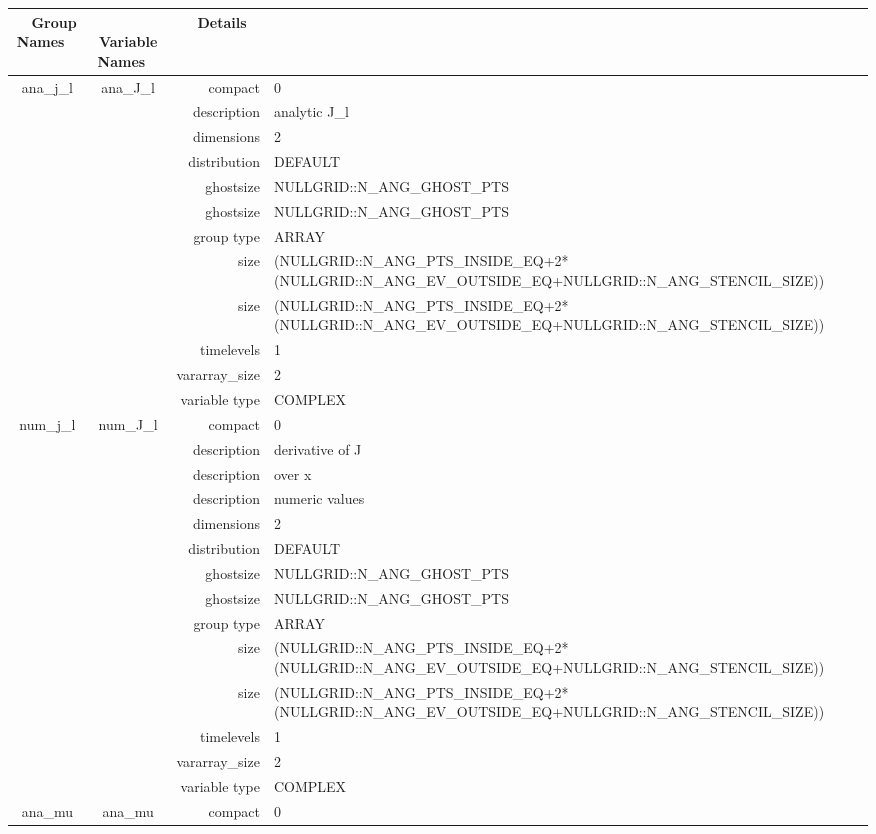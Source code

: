 \begin{tabular*}{150mm}{|c|c@{\extracolsep{\fill}}|rl|} \hline 
~ {\bf Group Names} ~ & ~ {\bf Variable Names} ~  &{\bf Details} ~ & ~ \\ 
\hline 
ana\_j\_l & ana\_J\_l & compact & 0 \\ 
 &  & description & analytic J\_l \\ 
 &  & dimensions & 2 \\ 
 &  & distribution & DEFAULT \\ 
 &  & ghostsize & NULLGRID::N\_ANG\_GHOST\_PTS \\ 
& ~ & ghostsize & NULLGRID::N\_ANG\_GHOST\_PTS \\ 
 &  & group type & ARRAY \\ 
 &  & size & (NULLGRID::N\_ANG\_PTS\_INSIDE\_EQ+2*(NULLGRID::N\_ANG\_EV\_OUTSIDE\_EQ+NULLGRID::N\_ANG\_STENCIL\_SIZE)) \\ 
& ~ & size & (NULLGRID::N\_ANG\_PTS\_INSIDE\_EQ+2*(NULLGRID::N\_ANG\_EV\_OUTSIDE\_EQ+NULLGRID::N\_ANG\_STENCIL\_SIZE)) \\ 
 &  & timelevels & 1 \\ 
 &  & vararray\_size & 2 \\ 
 &  & variable type & COMPLEX \\ 
\hline 
num\_j\_l & num\_J\_l & compact & 0 \\ 
 &  & description & derivative of J \\ 
& ~ & description &  over x \\ 
 &  & description &  numeric values \\ 
 &  & dimensions & 2 \\ 
 &  & distribution & DEFAULT \\ 
 &  & ghostsize & NULLGRID::N\_ANG\_GHOST\_PTS \\ 
& ~ & ghostsize & NULLGRID::N\_ANG\_GHOST\_PTS \\ 
 &  & group type & ARRAY \\ 
 &  & size & (NULLGRID::N\_ANG\_PTS\_INSIDE\_EQ+2*(NULLGRID::N\_ANG\_EV\_OUTSIDE\_EQ+NULLGRID::N\_ANG\_STENCIL\_SIZE)) \\ 
& ~ & size & (NULLGRID::N\_ANG\_PTS\_INSIDE\_EQ+2*(NULLGRID::N\_ANG\_EV\_OUTSIDE\_EQ+NULLGRID::N\_ANG\_STENCIL\_SIZE)) \\ 
 &  & timelevels & 1 \\ 
 &  & vararray\_size & 2 \\ 
 &  & variable type & COMPLEX \\ 
\hline 
ana\_mu & ana\_mu & compact & 0 \\ 

\end{tabular*}
